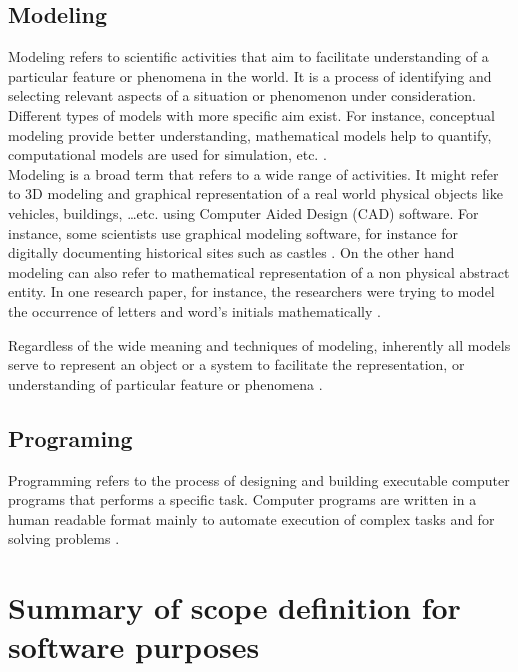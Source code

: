 \subsection{Modeling}
\label{sec:purpose:Types:Modelling}

Modeling refers to scientific activities that aim to facilitate understanding of a particular feature or phenomena in the world. It is a process of identifying and selecting relevant aspects of a situation or phenomenon under consideration. Different types of models with more specific aim exist.  For instance, conceptual modeling provide better understanding, mathematical models help to quantify, computational models are used for simulation, etc. \citep{enwiki:1051627717}.\\

Modeling is a broad term that refers to a wide range of activities. It might refer to 3D modeling and graphical representation of a real world physical objects like vehicles, buildings, …etc.  using Computer Aided Design (CAD) software. For instance, some scientists use graphical modeling software, for instance for digitally documenting historical sites such as castles \citep{el2007detailed}. On the other hand modeling can also refer to mathematical representation of a non physical abstract entity. In one research paper, for instance, the researchers were trying to model the occurrence of letters and word’s initials mathematically \citep{pande2010mathematical}. 

Regardless of the wide meaning and techniques of modeling, inherently all models serve to represent an object or a system to facilitate the representation, or understanding of particular feature or phenomena \citep{enwiki:1058944086, enwiki:1051627717}.  


\subsection{Programing}
\label{sec:purpose:Types:Programing}
Programming refers to the process of designing and building executable computer programs that performs a specific task. Computer programs are written in a human readable format mainly to automate execution of complex tasks and for solving problems \citep{enwiki:1062649903}. 

\section{Summary of scope definition for software purposes}
\label{sec:purpose:SummaryPurposes}

